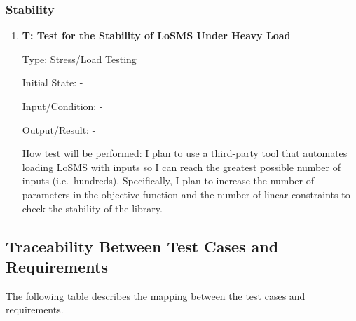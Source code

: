 \documentclass[12pt, titlepage]{article}
\newcounter{testnum} %
\newcommand{\famname}{LoSMS}
\begin{document}
\subsubsection{Stability}

\begin{enumerate}
	\item{\textbf{T\thetestnum \label{Stability}: Test 
	for the Stability of \famname{} Under Heavy Load}}
	
	Type: Stress/Load Testing
	
	Initial State: -
	
	Input/Condition: -
	
	Output/Result: -
	
	How test will be performed: I plan to use a third-party tool that automates 
	loading \famname{} with inputs so I can reach the greatest possible number 
	of inputs (i.e.~hundreds). Specifically, I plan to increase the number 
	of parameters in the objective function and the number of linear 
	constraints to check the stability of the library. 

\end{enumerate}

\subsection{Traceability Between Test Cases and Requirements}

The following table describes the mapping between the test cases and 
requirements.
\end{document}
